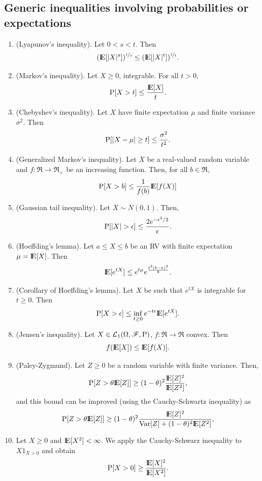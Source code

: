 \documentclass[a4paper,10pt]{article}
\begin{document}
\subsection{Generic inequalities involving probabilities or expectations}
\begin{enumerate}
  \item (Lyapunov's inequality). Let $0<s<t$. Then
  \[
   (\E[|X|^s])^{\nicefrac{1}{s}} \leq (\E[|X|^t])^{\nicefrac{1}{t}}.
  \]

  \item (Markov's inequality). Let $X\geq 0$, integrable. For all $t>0$, 
 \[ 
 \prob[X>t]\leq \frac{\E[X]}{t}.
 \]
 \item (Chebyshev's inequality). Let $X$ have finite expectation $\mu$ and finite variance $\sigma^2$. Then
 \[
  \mathrm{P}[|X-\mu|\geq t] \leq \frac{\sigma^2}{t^2}.
 \]
 \item (Generalized Markov's inequality). Let $X$ be a real-valued random variable and $f:\Re\to\Re_+$
       be an increasing function. Then, for all $b\in\Re$,
       \[
        \prob[X>b]\leq \frac{1}{f(b)}\E[f(X)]
       \]
  \item (Gaussian tail inequality). Let $X\sim N(0,1)$. Then,
 \[ 
  \prob[|X|>\epsilon] \leq \frac{2e^{-\epsilon^2/2}}{\epsilon}.
 \]       
 \item (Hoeffding's lemma). Let $a\leq X\leq b$ be an RV with finite expectation $\mu=\E[X]$.
 Then
 \[
  \E[e^{tX}] \leq e^{t\mu}e^{\frac{t^2(b-a)^2}{8}}.
 \]
\item (Corollary of Hoeffding's lemma). Let $X$ be such that $e^{tX}$ is integrable for $t\geq 0$. Then
\[
 \prob[X>\epsilon]\leq \inf_{t\geq 0}e^{-t\epsilon}\E[e^{tX}].
\]
 \item (Jensen's inequality). Let $X\in\mathcal{L}_1(\Omega,\mathscr{F},\mathrm{P})$, $f:\Re\to\Re$ convex. Then
   \[
     f(\E[X])\leq \E[f(X)].
    \]
\item (Paley-Zygmund). Let $Z\geq 0$ be a random variable with finite variance. Then,
      \[
       \prob[Z > \theta \E[Z]] \geq (1-\theta)^2\frac{\E[Z]^2}{\E[Z^2]},
      \]
     and this bound can be improved (using the Cauchy-Schwartz inequality) as
     \[
       \prob[Z > \theta \E[Z]] \geq (1-\theta)^2\frac{\E[Z]^2}{\mathrm{Var}[Z]+(1-\theta)^2\E[Z^2]},
      \]
\item Let $X\geq 0$ and $\E[X^2]<\infty$. We apply the Cauchy-Schwarz inequality to $X1_{X>0}$ and obtain
      \[
       \prob[X>0] \geq \frac{\E[X]^2}{\E[X^2]}.
      \]




\end{enumerate}
\end{document}
